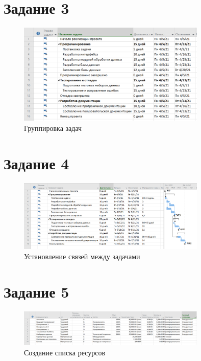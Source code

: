 \section{Задание 3}

\begin{figure}[H]
    \centering
    \includegraphics[width=0.8\textwidth]{img/content/task_03.png}
    \caption{Группировка задач}
    \label{fig:task_03}
\end{figure}

\section{Задание 4}

\begin{figure}[H]
    \centering
    \includegraphics[width=0.8\textwidth]{img/content/task_04.png}
    \caption{Установление связей между задачами}
    \label{fig:task_04}
\end{figure}

\section{Задание 5}

\begin{figure}[H]
    \centering
    \includegraphics[width=0.8\textwidth]{img/content/task_05_1.png}
    \caption{Создание списка ресурсов}
    \label{fig:task_05_1}
\end{figure}

